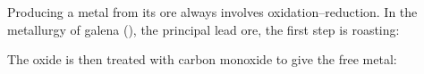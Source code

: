 \documentclass{apchem-exam}
\begin{document}

Producing a metal from its ore always involves oxidation--reduction. In the
metallurgy of galena (), the principal lead ore, the first step is
roasting:

\begin{center}
\end{center}

The oxide is then treated with carbon monoxide to give the free metal:

\begin{center}
\end{center}
\end{document}
